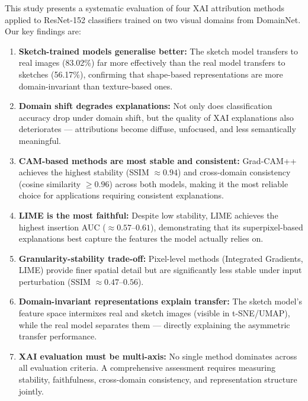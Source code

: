 \documentclass[12pt, a4paper]{article}
\begin{document}
This study presents a systematic evaluation of four XAI attribution methods
applied to ResNet-152 classifiers trained on two visual domains from DomainNet.
Our key findings are:

\begin{enumerate}[leftmargin=*]
    \item \textbf{Sketch-trained models generalise better:}  The sketch model
          transfers to real images (83.02\%) far more effectively than the real
          model transfers to sketches (56.17\%), confirming that shape-based
          representations are more domain-invariant than texture-based ones.

    \item \textbf{Domain shift degrades explanations:}  Not only does
          classification accuracy drop under domain shift, but the quality of
          XAI explanations also deteriorates --- attributions become diffuse,
          unfocused, and less semantically meaningful.

    \item \textbf{CAM-based methods are most stable and consistent:}
          Grad-CAM++ achieves the highest stability (SSIM $\approx 0.94$) and
          cross-domain consistency (cosine similarity $\geq 0.96$) across both
          models, making it the most reliable choice for applications requiring
          consistent explanations.

    \item \textbf{LIME is the most faithful:}  Despite low stability, LIME
          achieves the highest insertion AUC ($\approx 0.57$--$0.61$),
          demonstrating that its superpixel-based explanations best capture
          the features the model actually relies on.

    \item \textbf{Granularity-stability trade-off:}  Pixel-level methods
          (Integrated Gradients, LIME) provide finer spatial detail but are
          significantly less stable under input perturbation (SSIM $\approx
          0.47$--$0.56$).

    \item \textbf{Domain-invariant representations explain transfer:}
          The sketch model's feature space intermixes real and sketch images
          (visible in t-SNE/UMAP), while the real model separates them ---
          directly explaining the asymmetric transfer performance.

    \item \textbf{XAI evaluation must be multi-axis:}  No single method
          dominates across all evaluation criteria.  A comprehensive assessment
          requires measuring stability, faithfulness, cross-domain consistency,
          and representation structure jointly.
\end{enumerate}
\end{document}
